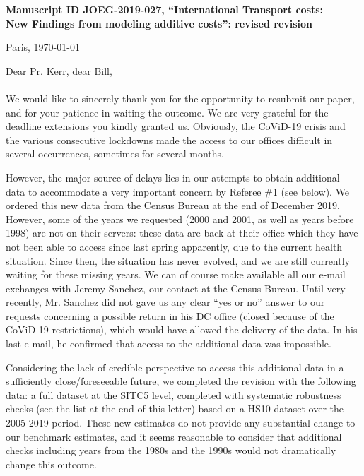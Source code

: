 \documentclass[12pt]{article}
\begin{document}
\noindent \textbf{Manuscript ID JOEG-2019-027, ``International Transport costs:\\New Findings from modeling additive costs'': revised revision}

\bigskip
\bigskip

\hfill Paris, \today

\bigskip
\noindent Dear Pr. Kerr, dear Bill, \\
\\
\noindent \noindent We would like to sincerely thank you for the opportunity to resubmit our paper, and for your patience in waiting the outcome. We are very grateful for the deadline extensions you kindly granted us. Obviously, the CoViD-19 crisis and the various consecutive lockdowns made the access to our offices difficult in several occurrences, sometimes for several months. \medskip

However, the major source of delays lies in our attempts to obtain additional data to accommodate a very important concern by Referee \#1 (see below). We ordered this new data from the Census Bureau at the end of December 2019. However, some of the years we requested (2000 and 2001, as well as years before 1998) are not on their servers: these data are back at their office which they have not been able to access since last spring apparently, due to the current health situation. Since then, the situation has never evolved, and we are still currently waiting for these missing years. We can of course make available all our e-mail exchanges with Jeremy Sanchez, our contact at the Census Bureau. Until very recently, Mr. Sanchez did not gave us any clear “yes or no” answer to our requests concerning a possible return in his DC office (closed because of the CoViD 19 restrictions), which would have allowed the delivery of the data. In his last e-mail, he confirmed that access to the additional data was impossible.\medskip

Considering the lack of credible perspective to access this additional data in a sufficiently close/foreseeable future, we completed the revision with the following data: a full dataset at the SITC5 level, completed with systematic robustness checks (see the list at the end of this letter) based on a HS10 dataset over the 2005-2019 period. These new estimates do not provide any substantial change to our benchmark estimates, and it seems reasonable to consider that additional checks including years from the 1980s and the 1990s would not dramatically change this outcome. \medskip
\end{document}
